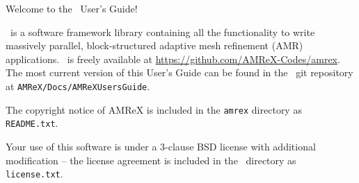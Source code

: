 Welcome to the \amrex\ User's Guide!

\amrex\ is a software framework library containing all the
functionality to write massively parallel, block-structured adaptive
mesh refinement (AMR) applications.  \amrex\ is freely available at
\url{https://github.com/AMReX-Codes/amrex}.  The most current version
of this User's Guide can be found in the \amrex\ git repository at
{\tt AMReX/Docs/AMReXUsersGuide}.

The copyright notice of AMReX is included in the {\tt amrex} directory
as {\tt README.txt}.

Your use of this software is under a 3-clause BSD license with
additional modification -- the license agreement is included in the
\amrex\ directory as {\tt license.txt}.


